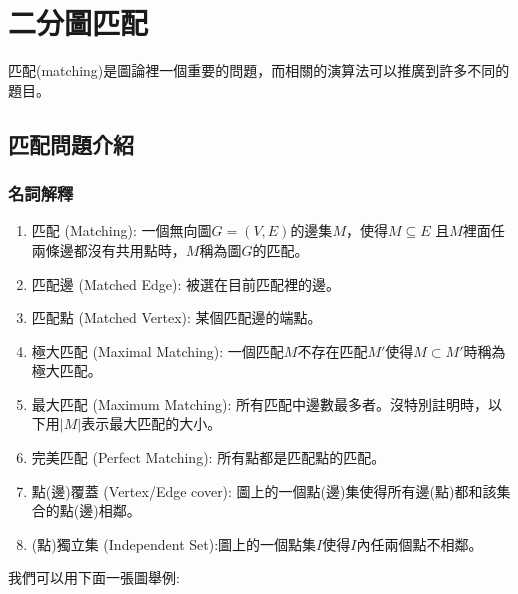 \documentclass[main.tex]{subfiles}
\begin{document}
\chapter{二分圖匹配}

\> 匹配(matching)是圖論裡一個重要的問題，而相關的演算法可以推廣到許多不同的題目。

\section{匹配問題介紹}

\subsection{名詞解釋}

\begin{enumerate}
	\item 匹配 (Matching): 一個無向圖$G = (V, E)$的邊集$M$，使得$M \subseteq E$ 且$M$裡面任兩條邊都沒有共用點時，$M$稱為圖$G$的匹配。
	\item 匹配邊 (Matched Edge): 被選在目前匹配裡的邊。
	\item 匹配點 (Matched Vertex): 某個匹配邊的端點。
	\item 極大匹配 (Maximal Matching): 一個匹配$M$不存在匹配$M'$使得$M \subset M'$時稱為極大匹配。
	\item 最大匹配 (Maximum Matching): 所有匹配中邊數最多者。沒特別註明時，以下用$|M|$表示最大匹配的大小。
	\item 完美匹配 (Perfect Matching): 所有點都是匹配點的匹配。
	\item 點(邊)覆蓋 (Vertex/Edge cover): 圖上的一個點(邊)集使得所有邊(點)都和該集合的點(邊)相鄰。 
	\item (點)獨立集 (Independent Set):圖上的一個點集\(I\)使得\(I\)內任兩個點不相鄰。
\end{enumerate}

\pagebreak
我們可以用下面一張圖舉例:

\begin{center}
\end{center}
\end{document}

